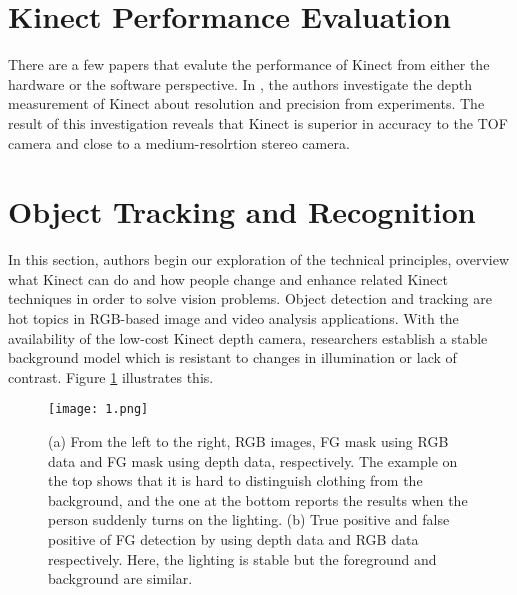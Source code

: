 \documentclass[a4paper]{article}
\begin{document}
\begin{multicols}{2}
\section{Kinect Performance Evaluation}
There are a few papers that evalute the performance of Kinect from either the hardware or the software perspective. In \cite{E1} , the authors investigate the depth measurement of Kinect about resolution and precision from experiments. The result of this investigation reveals that Kinect is superior in accuracy to the TOF camera and close to a medium-resolrtion stereo camera.\\
\section{Object Tracking and Recognition}
In this section, authors begin our exploration of the technical principles, overview what Kinect can do and how people change and enhance related Kinect techniques in order to solve vision problems. Object detection and tracking are hot topics in RGB-based image and video analysis applications. With the availability of the low-cost Kinect depth camera, researchers establish a stable background model which is resistant to changes in illumination or lack of contrast. Figure \ref{fig} illustrates this.\\
\end{multicols}
\begin{figure}[htbp]
\centering
\texttt{[image: 1.png]}
\caption{(a) From the left to the right, RGB images, FG mask using RGB data and FG mask using depth data, respectively. The example on the top shows that it is hard to distinguish clothing from the background, and the one at the bottom reports the results when the person suddenly turns on the lighting. (b) True positive and false positive of FG detection by using depth data and RGB data respectively. Here, the lighting is stable but the foreground and background are similar.}
\label{fig}
\end{figure}

\end{document}
